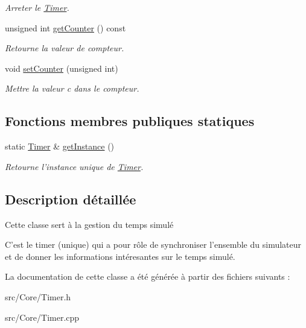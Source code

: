 \begin{DoxyCompactItemize}
\begin{DoxyCompactList}\small\item\em Arreter le \hyperlink{classTimer}{Timer}. \end{DoxyCompactList}\item 
\hypertarget{classTimer_a03ffd75bbb89ff1644839523af9fda03}{unsigned int \hyperlink{classTimer_a03ffd75bbb89ff1644839523af9fda03}{get\-Counter} () const }\label{classTimer_a03ffd75bbb89ff1644839523af9fda03}

\begin{DoxyCompactList}\small\item\em Retourne la valeur de compteur. \end{DoxyCompactList}\item 
\hypertarget{classTimer_a7394d4c4edb4d951dbe2c7e1ab2fb7ae}{void \hyperlink{classTimer_a7394d4c4edb4d951dbe2c7e1ab2fb7ae}{set\-Counter} (unsigned int)}\label{classTimer_a7394d4c4edb4d951dbe2c7e1ab2fb7ae}

\begin{DoxyCompactList}\small\item\em Mettre la valeur c dans le compteur. \end{DoxyCompactList}\end{DoxyCompactItemize}
\subsection*{Fonctions membres publiques statiques}
\begin{DoxyCompactItemize}
\item 
\hypertarget{classTimer_a8357f90f20707f9693fc713319de923a}{static \hyperlink{classTimer}{Timer} \& \hyperlink{classTimer_a8357f90f20707f9693fc713319de923a}{get\-Instance} ()}\label{classTimer_a8357f90f20707f9693fc713319de923a}

\begin{DoxyCompactList}\small\item\em Retourne l'instance unique de \hyperlink{classTimer}{Timer}. \end{DoxyCompactList}\end{DoxyCompactItemize}


\subsection{Description détaillée}
Cette classe sert à la gestion du temps simulé 

C'est le timer (unique) qui a pour rôle de synchroniser l'ensemble du simulateur et de donner les informations intéresantes sur le temps simulé. 

La documentation de cette classe a été générée à partir des fichiers suivants \-:\begin{DoxyCompactItemize}
\item 
src/\-Core/Timer.\-h\item 
src/\-Core/Timer.\-cpp\end{DoxyCompactItemize}
